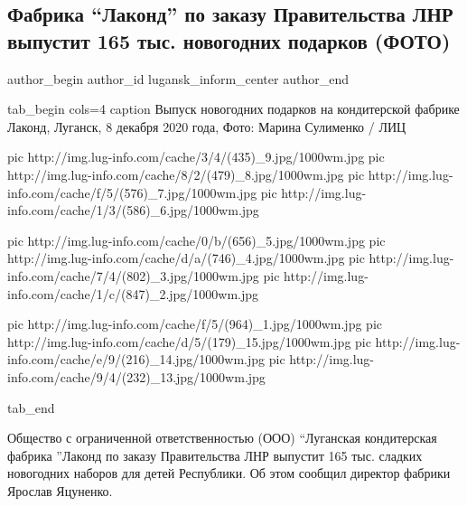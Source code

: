  
 
 
 
 
 
\subsection{Фабрика \enquote{Лаконд} по заказу Правительства ЛНР выпустит 165 тыс. новогодних подарков (ФОТО)}
\label{sec:09_12_2020.news.lnr.lug_info.1.fabrika_lakond}

\ifcmt
  author_begin
   author_id lugansk_inform_center
  author_end
\fi


\ifcmt
tab_begin cols=4
	caption Выпуск новогодних подарков на кондитерской фабрике Лаконд, Луганск, 8 декабря 2020 года, Фото: Марина Сулименко / ЛИЦ

pic http://img.lug-info.com/cache/3/4/(435)_9.jpg/1000wm.jpg
pic http://img.lug-info.com/cache/8/2/(479)_8.jpg/1000wm.jpg
pic http://img.lug-info.com/cache/f/5/(576)_7.jpg/1000wm.jpg
pic http://img.lug-info.com/cache/1/3/(586)_6.jpg/1000wm.jpg

pic http://img.lug-info.com/cache/0/b/(656)_5.jpg/1000wm.jpg
pic http://img.lug-info.com/cache/d/a/(746)_4.jpg/1000wm.jpg
pic http://img.lug-info.com/cache/7/4/(802)_3.jpg/1000wm.jpg
pic http://img.lug-info.com/cache/1/c/(847)_2.jpg/1000wm.jpg

pic http://img.lug-info.com/cache/f/5/(964)_1.jpg/1000wm.jpg
pic http://img.lug-info.com/cache/d/5/(179)_15.jpg/1000wm.jpg
pic http://img.lug-info.com/cache/e/9/(216)_14.jpg/1000wm.jpg
pic http://img.lug-info.com/cache/9/4/(232)_13.jpg/1000wm.jpg

tab_end
\fi

Общество с ограниченной ответственностью (ООО) \enquote{Луганская кондитерская фабрика
}Лаконд по заказу Правительства ЛНР выпустит 165 тыс. сладких новогодних
наборов для детей Республики. Об этом сообщил директор фабрики Ярослав
Яцуненко.

